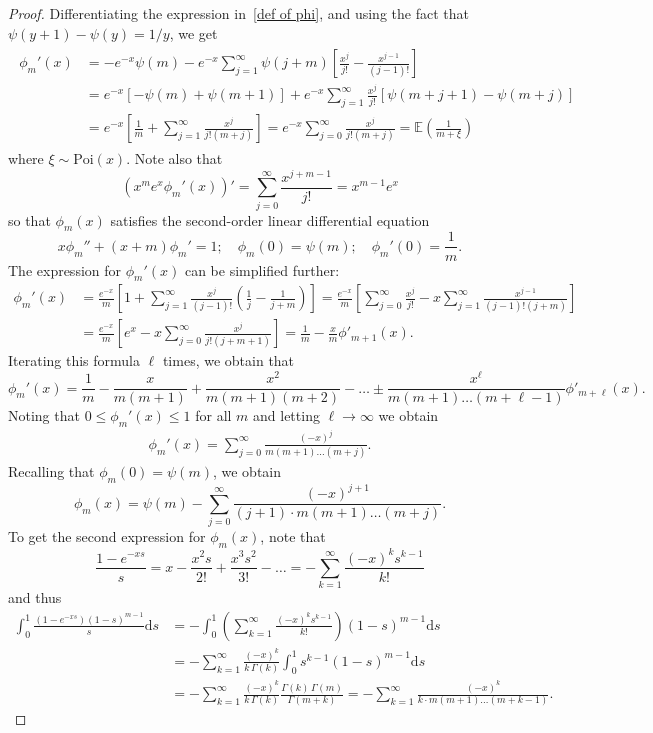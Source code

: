 \documentclass[10pt,a4paper]{amsart}
\begin{document}
\begin{proof}
Differentiating the expression in~\eqref{def of phi}, and using the fact that $\psi(y+1)-\psi(y)=1/y$, we get
\begin{align}\label{eq:phiprime}
\begin{split}
\phi_m'(x)&=-e^{-x}\psi(m)-
e^{-x}\sum_{j=1}^\infty\psi(j+m)\left[\frac{x^j}{j!}-\frac{x^{j-1}}{(j-1)!}\right]
\\ &=
e^{-x}\left[ -\psi(m)+\psi(m+1)\right]
+e^{-x}\sum_{j=1}^\infty\frac{x^j}{j!}\left[\psi(m+j+1)-\psi(m+j)\right]
\\ &
=e^{-x}\left[\frac1m
+\sum_{j=1}^\infty\frac{x^j}{j!(m+j)}
\right]
=e^{-x}\sum_{j=0}^\infty\frac{x^j}{j!(m+j)}
=\mathbb{E}\left(\frac1{m+\xi}\right)
\end{split}\end{align}
where $\xi \sim \mathrm{Poi}(x)$. Note also that
$$
\left(x^m e^x \phi_m'(x)\right)'=\sum_{j=0}^\infty \frac{x^{j+m-1}}{j!}=x^{m-1} e^x
$$
so that $\phi_m(x)$ satisfies the second-order linear differential equation
$$
x \phi_m''+(x+m)\phi_m'=1;\quad\phi_m(0)=\psi(m); \quad \phi_m'(0)=\frac1m.
$$
The expression for $\phi_m'(x)$ can be simplified
further:
\begin{align*}
\phi_m'(x)&=\frac{e^{-x}}m\left[1
+\sum_{j=1}^\infty\frac{x^j}{(j-1)!} \left(\frac1j-\frac1{j+m}\right)
\right]=
\frac{e^{-x}}m\left[\sum_{j=0}^\infty\frac{x^j}{j!} 
-x\sum_{j=1}^\infty\frac{x^{j-1}}{(j-1)!(j+m)} 
\right]
\\ &=
\frac{e^{-x}}m\left[e^x
-x\sum_{j=0}^\infty\frac{x^{j}}{j!(j+m+1)} 
\right]
=\frac1m -\frac{x}m\phi'_{m+1}(x).
\end{align*}
Iterating this formula $\ell$ times, we obtain that
$$
\phi_m'(x)=\frac1m-\frac{x}{m(m+1)}
+\frac{x^2}{m(m+1)(m+2)}-\dots  \pm \frac{x^\ell}{m(m+1)\dots(m+\ell-1)}\phi'_{m+\ell}(x).
$$
Noting that $0\le \phi_m'(x)\le 1$ for all $m$ and letting $\ell\to\infty$ we obtain 
\begin{align}\label{phiT}
\phi_m'(x)=
\sum_{j=0}^\infty \frac{(-x)^j}{m(m+1)\dots(m+j)}.
\end{align}
Recalling that $\phi_m(0)=\psi(m)$, we obtain $$\phi_m(x)=\psi(m)-\sum_{j=0}^\infty \frac{(-x)^{j+1}}{(j+1)\cdot m(m+1)\dots(m+j)}.$$
To get the second expression for $\phi_m(x)$, note that
$$
\frac{1-e^{-xs}}{s}=x-\frac{x^2s}{2!}+\frac{x^3s^2}{3!}-\dots=-\sum_{k=1}^\infty \frac{(-x)^ks^{k-1}}{k!}
$$
and thus
\begin{align*}
\int_0^1 \frac{(1-e^{-xs})(1-s)^{m-1}}{s}\mathrm{d}s
&=-\int_0^1 \left(\sum_{k=1}^\infty \frac{(-x)^ks^{k-1}}{k!}\right)(1-s)^{m-1}\mathrm{d}s
\\ &
=-\sum_{k=1}^\infty \frac{(-x)^k}{k\,\Gamma(k)}\int_0^1 s^{k-1}(1-s)^{m-1}\mathrm{d}s
\\ &=-
\sum_{k=1}^\infty \frac{(-x)^k}{k\,\Gamma(k)} \frac{\Gamma(k)\,\Gamma(m)}{\Gamma(m+k)}
=-
\sum_{k=1}^\infty \frac{(-x)^k}{k\cdot m(m+1)\dots(m+k-1)}.
\end{align*}
\end{proof}
\end{document}
